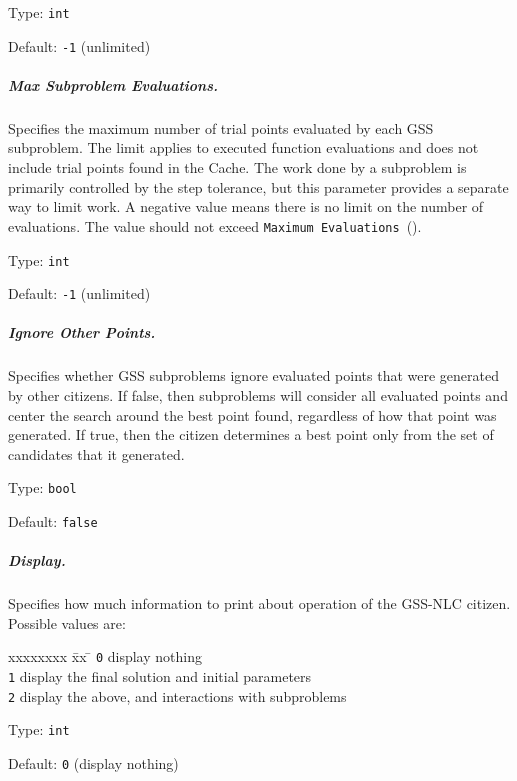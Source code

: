\hspace{0.2in}
Type: {\tt int}

\hspace{0.2in}
Default: {\tt -1} (unlimited)

\subparagraph{Max Subproblem Evaluations.}  \label{param:GSN-maxsubeval}
Specifies the maximum number of trial points evaluated by each GSS subproblem.
The limit applies to executed function evaluations and does not include
trial points found in the Cache.
The work done by a subproblem is primarily controlled by the step tolerance,
but this parameter provides a separate way to limit work.
A negative value means there is no limit on the number of evaluations.
The value should not exceed
{\tt Maximum Evaluations}~().

\hspace{0.2in}
Type: {\tt int}

\hspace{0.2in}
Default: {\tt -1} (unlimited)

\subparagraph{Ignore Other Points.}  \label{param:GSN-ignore}
Specifies whether GSS subproblems ignore evaluated points that were
generated by other citizens.  If false, then subproblems will consider all
evaluated points and center the search around the best point found, regardless
of how that point was generated.  If true, then the citizen determines a best
point only from the set of candidates that it generated.

\hspace{0.2in}
Type: {\tt bool}

\hspace{0.2in}
Default: {\tt false}

\subparagraph{Display.}  \label{param:GSN-display}
Specifies how much information to print about operation of the GSS-NLC citizen.
Possible values are:
\begin{tabbing}
  xxxxxxxx \= xx \= \kill
     \> {\tt 0} \> display nothing  \\
     \> {\tt 1} \> display the final solution and initial parameters  \\
     \> {\tt 2} \> display the above, and interactions with subproblems  \\
\end{tabbing}

\hspace{0.2in}
Type: {\tt int}

\hspace{0.2in}
Default: {\tt 0} (display nothing)

